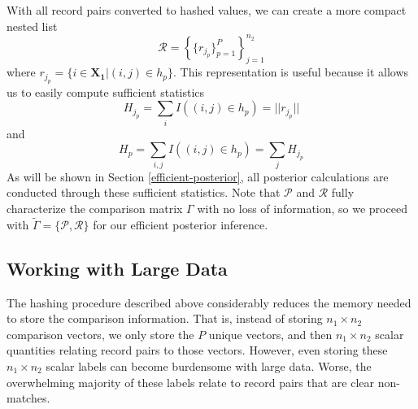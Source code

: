 \documentclass[12pt,letterpaper]{article}
\newcommand{\1}[1]{\mathbb{I}\!\left[#1\right]} %
\begin{document}
With all record pairs converted to hashed values, we can create a more compact nested list 
$$\mathcal{R} = \left\{\{r_{j_p} \}_{p=1}^{P} \right\}_{j = 1}^{n_2}$$
where $r_{j_p} = \{i \in \bm{X_1} | (i, j) \in h_p\}$. This representation is useful because it allows us to easily compute sufficient statistics
$$H_{j_p} = \sum_{i} I((i, j) \in h_p) = ||r_{j_p}||$$
and
$$H_p =  \sum_{i, j} I((i, j) \in h_p) = \sum_{j} H_{j_p}$$
As will be shown in Section \ref{efficient-posterior}, all posterior calculations are conducted through these sufficient statistics. Note that $\mathcal{P}$ and $\mathcal{R}$ fully characterize the comparison matrix $\Gamma$ with no loss of information, so we proceed with $\tilde{\Gamma} = \{\mathcal{P}, \mathcal{R}\}$ for our efficient posterior inference. 

\hypertarget{large-data}{%
	\subsection{Working with Large Data}\label{large-data}}

The hashing procedure described above considerably reduces the memory
needed to store the comparison information. That is, instead of storing
\(n_1 \times n_2\) comparison vectors, we only store the
\(P\) unique vectors, and then \(n_1 \times n_2\) scalar quantities
relating record pairs to those vectors. However, even storing these
\(n_1 \times n_2\) scalar labels can become burdensome with large data.
Worse, the overwhelming majority of these labels relate to record pairs
that are clear non-matches.

\end{document}
